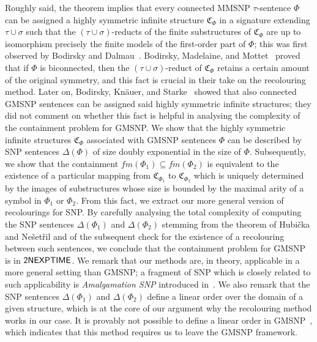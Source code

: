 \documentclass[oneside,reqno,12pt]{amsart}
\theoremstyle{plain}
\theoremstyle{remark}
\newcommand{\struct}[1]{\mathfrak{#1}}
\newcommand{\fm}{\ensuremath{\mathit{fm}}\xspace}
\newcommand{\TWONEXPTIME}{{\textup{\textsf{2NEXPTIME}}}\xspace}
\begin{document}
Roughly said, the theorem implies that every connected MMSNP $\tau$-sentence $\Phi$ can be assigned a highly symmetric infinite structure $\struct{C}_{\Phi}$ in a signature extending $\tau\cup \sigma$ such that the $(\tau\cup \sigma)$-reducts of the finite substructures of $\struct{C}_{\Phi}$ are up to isomorphism precisely the finite models of the first-order part of $\Phi$; this was first observed by Bodirsky and Dalmau~\cite{BodDalJournal}.
Bodirsky, Madelaine, and Mottet~\cite{bodirsky2018_article} proved that if $\Phi$ is biconnected, then the $(\tau\cup \sigma)$-reduct of $\struct{C}_{\Phi}$ retains a certain amount of the original symmetry, and this fact is crucial in their take on the recolouring method.
Later on, Bodirsky, Kn\"{a}uer, and Starke~\cite{bodirsky_asnp} showed that also connected GMSNP sentences can be assigned said highly symmetric infinite structures; they did not comment on whether this fact is helpful in analysing the complexity of the containment problem for GMSNP. 
We show that the highly symmetric infinite structures $\struct{C}_{\Phi}$ associated with GMSNP sentences $\Phi$ can be described by SNP sentences $\Delta(\Phi)$ of size doubly exponential in the size of $\Phi$.
Subsequently, we show that the containment $\fm(\Phi_1)\subseteq \fm(\Phi_2)$ is equivalent to the existence of a particular mapping from $\struct{C}_{\Phi_1} $ to $ \struct{C}_{\Phi_2}$ which is uniquely determined by the images of substructures whose size is bounded by the maximal arity of a symbol in $\Phi_1$ or $\Phi_2$.
From this fact, we extract our more general version of recolourings for SNP.
By carefully analysing the total complexity of computing the SNP sentences $\Delta(\Phi_1)$ and $\Delta(\Phi_2)$ stemming from the theorem of Hubi\v{c}ka and Ne\v{s}et\v{r}il and of the subsequent check for the existence of a recolouring between such sentences, we conclude that the containment problem for GMSNP is in $\TWONEXPTIME$.
We remark that our methods are, in theory,  applicable in a more general setting than GMSNP; a fragment of SNP which is closely related to such applicability is  \emph{Amalgamation SNP} introduced in~\cite{bodirsky_asnp}.
We also remark that the SNP sentences $\Delta(\Phi_1)$ and $\Delta(\Phi_2)$ define a linear order over the domain of a given structure, which is at the core of our argument why the recolouring method works in our case. It is provably not possible to define a linear order in GMSNP~\cite[Example~6]{bodirsky_asnp}, which indicates that this method requires us to leave the GMSNP framework.
\end{document}
